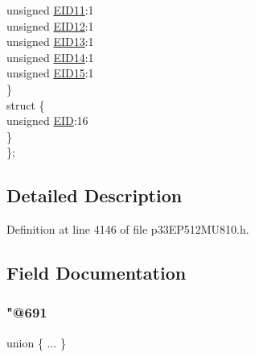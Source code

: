 \begin{DoxyCompactItemize}
\begin{tabbing}
\>\>unsigned \hyperlink{structtag_c1_r_x_f7_e_i_d_b_i_t_s_a710bdb0d602deb021b0be99066008018}{EID11}:1\\
\>\>unsigned \hyperlink{structtag_c1_r_x_f7_e_i_d_b_i_t_s_aa347bb85867bd8d4e0124f7cff8c6472}{EID12}:1\\
\>\>unsigned \hyperlink{structtag_c1_r_x_f7_e_i_d_b_i_t_s_a37d5f3edcbf6ef62f848fd4f3c584f79}{EID13}:1\\
\>\>unsigned \hyperlink{structtag_c1_r_x_f7_e_i_d_b_i_t_s_a7ffc0b0e0d99b8476b6f9a45337c17ab}{EID14}:1\\
\>\>unsigned \hyperlink{structtag_c1_r_x_f7_e_i_d_b_i_t_s_a293cd7dc1746257fa75a60cbd9383cd7}{EID15}:1\\
\>\} \\
\>struct \{\\
\>\>unsigned \hyperlink{structtag_c1_r_x_f7_e_i_d_b_i_t_s_ae80b378c9141f7c03e0b4e55b5f4b54d}{EID}:16\\
\>\} \\
\}; \\

\end{tabbing}\end{DoxyCompactItemize}


\subsection{Detailed Description}


Definition at line 4146 of file p33\+E\+P512\+M\+U810.\+h.



\subsection{Field Documentation}
\mbox{\label{structtag_c1_r_x_f7_e_i_d_b_i_t_s_a68ade412bfc0bf9642d3d715ae9692d5}} 
\subsubsection{\texorpdfstring{"@691}{@691}}
{\footnotesize\ttfamily union \{ ... \} }

\mbox{\label{structtag_c1_r_x_f7_e_i_d_b_i_t_s_ae80b378c9141f7c03e0b4e55b5f4b54d}} 
